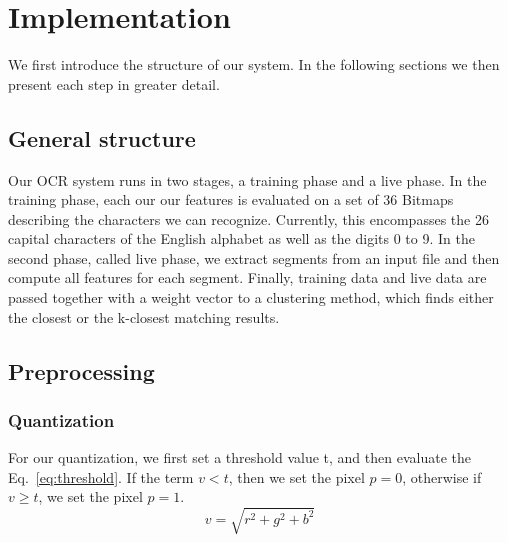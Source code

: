 \documentclass{article}
\begin{document}
\newpage

\section{Implementation}
We first introduce the structure of our system. In the following sections we then present each step in greater detail.

\subsection{General structure}
Our OCR system runs in two stages, a training phase and a live phase. In the training phase, each our our features is evaluated on a set of 36 Bitmaps describing the characters we can recognize. Currently, this encompasses the 26 capital characters of the English alphabet as well as the digits 0 to 9. In the second phase, called live phase, we extract segments from an input file and then compute all features for each segment. Finally, training data and live data are passed together with a weight vector to a clustering method, which finds either the closest or the k-closest matching results.

\subsection{Preprocessing}

\subsubsection{Quantization}
For our quantization, we first set a threshold value t, and then evaluate the Eq.~\ref{eq:threshold}. If the term $v < t$, then we set the pixel $p = 0$, otherwise if $v \geq t$, we set the pixel $p = 1$.
\begin{equation}
v = \sqrt{r^2 + g^2 + b^2}
\label{eq:threshold}
\end{equation}
\end{document}
